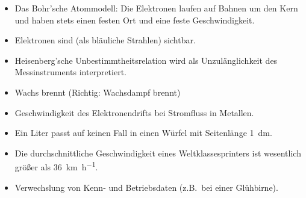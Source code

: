 \begin{itemize}
\item
Das Bohr'sche Atommodell: Die Elektronen laufen auf Bahnen um den Kern und haben stets einen festen Ort
und eine feste Geschwindigkeit.
\item
Elektronen sind (als bl\"{a}uliche Strahlen) sichtbar.
\item
Heisenberg'sche Unbestimmtheitsrelation wird als Unzulänglichkeit des Messinstruments interpretiert.
\end{itemize}

\begin{itemize}
\item
Wachs brennt (Richtig: Wachsdampf brennt)
\end{itemize}

\begin{itemize}
\item
Geschwindigkeit des Elektronendrifts bei Stromfluss in Metallen.
\item
Ein Liter passt auf keinen Fall in einen W\"{u}rfel mit Seitenl\"{a}nge
\SI{1}{\deci\meter}.
\item
Die durchschnittliche Geschwindigkeit eines Weltklassesprinters
ist wesentlich gr\"{o}{\ss}er als \SI{36}{\kilo\meter\per\hour}.
\end{itemize}

\begin{itemize}
\item
Verwechslung von Kenn- und Betriebsdaten (z.B.\ bei einer Gl\"{u}hbirne).
\end{itemize}



